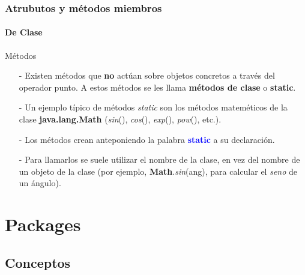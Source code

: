 \documentclass{beamer}
\begin{document}
        \begin{frame}
			\frametitle{Atrubutos y m\'etodos miembros}
			\framesubtitle{De Clase}

			\begin{block}{M\'etodos}
			    {\scriptsize
                    \begin{itemize}
			            \item[-] Existen m\'etodos que \textbf{no} act\'uan sobre objetos concretos a trav\'es del operador punto. A estos m\'etodos se les llama \textbf{m\'etodos de clase} o \textbf{static}.
                        \item[-] Un ejemplo t\'ipico de m\'etodos \emph{static} son los m\'etodos matem\'eticos de la clase \textbf{java.lang.Math} (\emph{sin}(), \emph{cos}(), \emph{exp}(), \emph{pow}(), etc.).
                    \end{itemize}
			    }
			\end{block}

			\begin{block}{}
			    {\scriptsize
			        \begin{itemize}
			            \item[-] Los m\'etodos crean anteponiendo la palabra \textcolor{blue}{\textbf{static}} a su declaraci\'on. 
			            \item[-]Para llamarlos se suele utilizar el nombre de la clase, en vez del nombre de un objeto de la clase (por ejemplo,
\textbf{Math}.\emph{sin}(ang), para calcular el \emph{seno} de un \'angulo).
                    \end{itemize}
			    }
			\end{block}
			
		\end{frame}	
		
    \section{Packages}
    
        \subsection{Conceptos}
\end{document}
